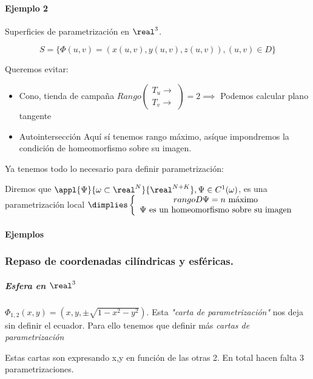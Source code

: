 \paragraph{Ejemplo 2} Superficies de parametrización en $\real^3$.

\[S = \{\Phi(u,v) = (x(u,v),y(u,v),z(u,v)), (u,v)\in D\}\]

Queremos evitar:

\begin{itemize}
\item Cono, tienda de campaña
$Rango \begin{pmatrix}
T_u \rightarrow\\
T_v \rightarrow
\end{pmatrix} = 2 \implies $ Podemos calcular plano tangente
\item Autointersección
Aquí sí tenemos rango máximo, asíque impondremos la condición de homeomorfismo sobre su imagen.
\end{itemize}

Ya tenemos todo lo necesario para definir parametrización:

\begin{defn}
Diremos que $\appl{\Psi}{\omega \subset \real^N}{\real^{N+K}}, \Psi \in C^1(\omega)$, es una parametrización local $\dimplies \left\{ \begin{array}{c}
 rango D\Psi = n \text{ máximo}\\
 \Psi \text{ es un homeomorfismo sobre su imagen}
\end{array}\right.$
\end{defn}



\paragraph{Ejemplos}
\subsubsection{Repaso de coordenadas cilíndricas y esféricas.}

\subparagraph{Esfera en $\real^3$}
 $\Phi_{1,2}(x,y) = (x,y,\pm \sqrt{1-x^2-y^2})$. Esta \emph{"carta de parametrización"} nos deja sin definir el ecuador. Para ello tenemos que definir más \emph{cartas de parametrización} 
 
 Estas cartas son expresando x,y en función de las otras 2. En total hacen falta 3 parametrizaciones.
 
